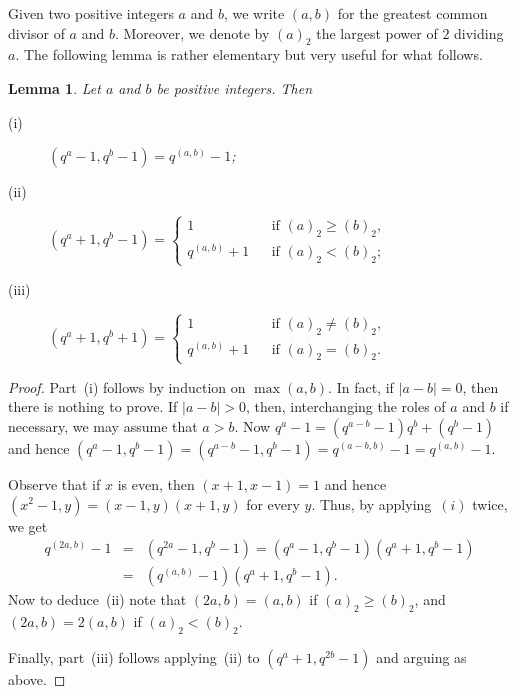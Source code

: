 \documentclass{amsart}
\newtheorem{lemma}[theorem]{Lemma}
\begin{document}
Given two positive integers $a$ and $b$, we write $(a,b)$ for the greatest common divisor of $a$ and $b$. Moreover, we denote by $(a)_2$ the largest power of $2$ dividing $a$. The following lemma is rather elementary but very useful for what follows. 

\begin{lemma}\label{basic}Let $a$ and $b$ be positive integers. Then
\begin{description}
\item[(i)]$(q^a-1,q^b-1)=q^{(a,b)}-1$;
\item[(ii)]$(q^a+1,q^b-1)=\left\{
\begin{array}{lcl}
1&&\textrm{if }(a)_2\geq (b)_2,\\
q^{(a,b)}+1&&\textrm{if }(a)_2<(b)_2;
\end{array}
\right.$
\item[(iii)]$
(q^a+1,q^b+1)=\left\{
\begin{array}{lcl}
1&&\textrm{if }(a)_2\neq  (b)_2,\\
q^{(a,b)}+1&&\textrm{if }(a)_2=(b)_2.
\end{array}
\right.
$
\end{description}
\end{lemma}
\begin{proof}
Part~(i) follows by induction on $\max(a,b)$. In fact, if $|a-b|=0$, then there is nothing to prove. If $|a-b|>0$, then, interchanging the roles of $a$ and $b$ if necessary, we may assume that $a>b$. Now $q^a-1=(q^{a-b}-1)q^b+(q^b-1)$ and hence $(q^a-1,q^b-1)=(q^{a-b}-1,q^b-1)=q^{(a-b,b)}-1=q^{(a,b)}-1$.

Observe that if $x$ is even, then $(x+1,x-1)=1$ and hence $(x^2-1,y)=(x-1,y)(x+1,y)$ for every $y$. Thus, by applying~$(i)$ twice, we get  
\begin{eqnarray*}
q^{(2a,b)}-1&=&(q^{2a}-1,q^{b}-1)=(q^a-1,q^{b}-1)(q^a+1,q^b-1)\\ 
&=&(q^{(a,b)}-1)(q^{a}+1,q^b-1).
\end{eqnarray*}
Now to deduce~(ii) note that $(2a,b)=(a,b)$ if $(a)_2\geq (b)_2$, and $(2a,b)=2(a,b)$ if $(a)_2<(b)_2$.

Finally, part~(iii) follows applying~(ii) to $(q^{a}+1,q^{2b}-1)$ and arguing as above. 
\end{proof}
\end{document}
